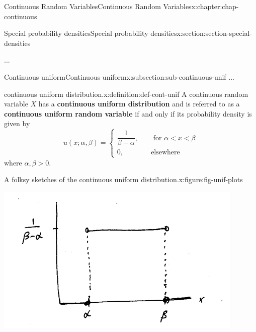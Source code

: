 \documentclass[oneside,10pt,]{book}
\newcommand{\terminology}[1]{\textbf{#1}}
\numberwithin{equation}{section}
\newcommand{\lt}{<}
\newcommand{\gt}{>}
\newcommand{\amp}{&}
\begin{document}
\begin{chapterptx}{Continuous Random Variables}{}{Continuous Random Variables}{}{}{x:chapter:chap-continuous}
\typeout{************************************************}
%
\begin{sectionptx}{Special probability densities}{}{Special probability densities}{}{}{x:section:section-special-densities}
\begin{introduction}{}%
...%
\end{introduction}%
%
%
\typeout{************************************************}
\typeout{************************************************}
%
\begin{subsectionptx}{Continuous uniform}{}{Continuous uniform}{}{}{x:subsection:sub-continuous-unif}
...%
\begin{definition}{continuous uniform distribution.}{x:definition:def-cont-unif}%
A continuous random variable \(\displaystyle X\) has a \terminology{continuous uniform distribution} and is referred to as a \terminology{continuous uniform random variable} if and only if its probability density is given by%
\begin{equation*}
u(x; \alpha, \beta) =
\begin{cases}\dfrac{1}{\beta - \alpha}, \amp \quad \text{ for }\alpha
\lt x \lt \beta\\0, \amp \quad \text{elsewhere}\end{cases}
\end{equation*}
where \(\alpha, \beta \gt 0\).%
\end{definition}
\begin{figureptx}{A folksy sketches of the continuous uniform distribution.}{x:figure:fig-unif-plots}{}%
\begin{image}{0.25}{0.5}{0.25}%
\includegraphics[width=\linewidth]{./images/unif.png}
\end{image}%

\end{figureptx}
\end{subsectionptx}
\end{sectionptx}
\end{chapterptx}
\end{document}

